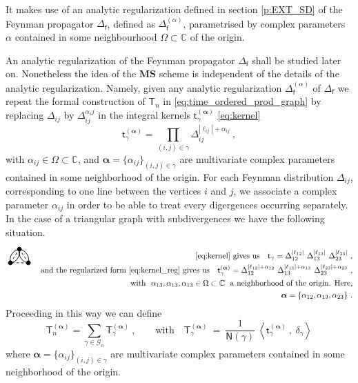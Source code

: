 \documentclass[11pt]{book}
\newcommand{\MS}{\textbf{MS}}
\newcommand{\alphabd}{\boldsymbol{\alpha}}
\newcommand{\abs}[1]{\left|#1\right|}
\newcommand{\sm}[1]{\left\langle#1\right\rangle}
\newcommand{\Gcal}{\mathcal{G}}
\newcommand{\Cbb}{\mathbb{C}}
\newcommand{\Nsf}{\mathsf{N}}
\newcommand{\Tsf}{\mathsf{T}}
\newcommand{\fsf}{\mathsf{f}}
\newcommand{\tsf}{\mathsf{t}}
\theoremstyle{break}
\newcommand{\triggraphtoreg}{\begin{tikzpicture}[thick,scale=2]
\useasboundingbox (-0.1,0.1) rectangle (0.5,0.4);
\filldraw (0,0) circle (1.3pt);
\filldraw (0.4,0) circle (1.3pt);
\filldraw (0.2,0.3) circle (1.3pt);
\draw (0,0) edge [out=105,in=185] node[above] {} (0.2,0.3);
\draw (0,0) edge [out=5,in=-75] node[above] {} (0.2,0.3);
\draw (0.4,0) edge [out=75,in=-5] node[above] {} (0.2,0.3);
\draw (0.4,0) edge [out=-185,in=-105] node[above] {} (0.2,0.3);
\draw[dashed] (0,0) -- (0.2,0.3);
\draw[dashed] (0.4,0) -- (0.2,0.3);
\draw[dashed] (0.4,0) -- (0,0);
\end{tikzpicture} }
\begin{document}
It makes use of an analytic regularization defined in section \ref{p:EXT_SD} of the Feynman propagator $\Delta_\fsf$, defined as $\Delta_\fsf^{(\alpha)}$, parametrised by complex parameters $\alpha$ contained in some neighbourhood $\Omega \subset \Cbb$ of the origin. 


An analytic regularization of the Feynman propagator $\Delta_\fsf$ shall be studied later on. Nonetheless the idea of the $\MS$ scheme is independent of the details of the analytic regularization. Namely, given any analytic regularization $\Delta^{(\alpha)}_\fsf$ of $\Delta_\fsf$ we repeat the formal construction of $\Tsf_n$ in \eqref{eq:time_ordered_prod_graph} by replacing $\Delta_{ij}$ by $\Delta^{\alpha_ij}_{ij}$ in the integral kernels $\tsf^{(\alphabd)}_\gamma$ \eqref{eq:kernel}  
%
\begin{equation}
\tsf^{(\alphabd)}_\gamma = \prod_{(i,j) \in \gamma} \Delta_{ij}^{\abs{\ell_{ij}}+\alpha_{ij}} \ ,
\label{eq:kernel_reg}
\end{equation}
%
with $\alpha_{ij} \in \Omega \subset \Cbb$, and $\alphabd=\{\alpha_{ij}\}_{(i,j) \in \gamma}$ are multivariate complex parameters contained in some neighborhood of the origin. For each Feynman distribution $\Delta_{ij}$, corresponding to one line between the vertices $i$ and $j$, we associate a complex parameter $\alpha_{ij}$ in order to be able to treat every digergences occurring separately. In the case of a triangular graph with subdivergences we have the following situation.
%
\begin{eqnarray*}
\triggraphtoreg
&& \mbox{\eqref{eq:kernel} gives us } \ \
\tsf_\gamma = \Delta_{12}^{\abs{\ell_{12}}} \ \Delta_{13}^{\abs{\ell_{13}}} \ \Delta_{23}^{\abs{\ell_{23}}} \ , \\
&& \mbox{and the regularized form \eqref{eq:kernel_reg} gives us } \ \ \tsf_\gamma^{(\alphabd)} = \Delta_{12}^{\abs{\ell_{12}}+\alpha_{12}} \ \Delta_{13}^{\abs{\ell_{13}}+\alpha_{13}} \ \Delta_{23}^{\abs{\ell_{23}}+\alpha_{23}} \ , \\
&& \mbox{with } \ \alpha_{13}, \alpha_{13}, \alpha_{13} \in \Omega \subset \Cbb \ \mbox{ a neighborhood of the origin. Here,} \\
&& \alphabd = \{ \alpha_{12} , \alpha_{13} , \alpha_{23} \} \ .
\end{eqnarray*}
%
Proceeding in this way we can define 
%
\begin{equation}
\Tsf_n^{(\alphabd)} = \sum_{\gamma \in \Gcal_n} \Tsf_\gamma^{(\alphabd)} \ , \qquad \mbox{with} \quad \Tsf_\gamma^{(\alphabd)} \ = \ \frac{1}{\Nsf(\gamma)} \ \sm{\tsf_\gamma^{(\alphabd)} \ , \ \delta_\gamma}
\label{eq:time_ordered_prod_graph_reg}
\end{equation}
%
where $\alphabd=\{\alpha_{ij}\}_{(i,j) \in \gamma}$ are multivariate complex parameters contained in some neighborhood of the origin.
\end{document}
